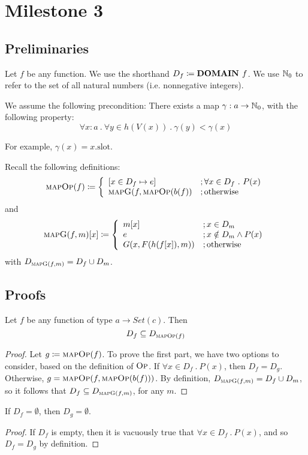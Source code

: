 \section{Milestone 3}

\subsection{Preliminaries}
Let $f$ be any \tlap function. We use the shorthand $D_f \coloneqq \text{\bf DOMAIN } f$.
We use $\mathbb N_0$ to refer to the set of all natural numbers (i.e. nonnegative integers).

We assume the following precondition: There exists a map $\gamma: a \to \mathbb N_0$, with the following property:
\[
\forall x\colon a \ .\ \forall y \in h(V(x)) \ .\ \gamma(y) < \gamma(x) 
\]

For example, $\gamma(x) = x.\text{slot}$.

Recall the following definitions:
\[
\textsc{mapOp}(f) \coloneqq \left\{ \begin{array}{ll} [ x \in D_f \mapsto e ] &; \forall x \in D_f \ .\ P(x) \\ \textsc{mapG}(f, \textsc{mapOp}(b(f)) &; \text{otherwise}\\ \end{array} \right.
\]
and
\[
\textsc{mapG}(f, m)[x] \coloneqq \left\{
\begin{array}{ll}
      m[x] &; x \in D_m \\
      e &; x \notin D_m \land P(x) \\
      G(x, F(h(f[x]), m)) &; \text{otherwise}\\
\end{array} 
\right. 
\]
with $D_{\textsc{mapG}(f,m)} = D_f \cup D_m$.

\subsection{Proofs}

\begin{lemma}\label{lemma1}
Let $f$ be any function of type $a \to Set(c)$. Then
\[
D_f \subseteq D_{\textsc{mapOp}(f)}
\]
\end{lemma}
\begin{proof}
Let $g \coloneqq \textsc{mapOp}(f)$. To prove the first part, we have two options to consider, based on the definition of $\textsc{Op}$. If $\forall x \in D_f \ .\ P(x)$, then $D_f = D_g$.
Otherwise, $g = \textsc{mapOp}(f,\textsc{mapOp}(b(f)))$. By definition, $D_{\textsc{mapG}(f,m)} = D_f \cup D_m$, so it follows that $D_f \subseteq D_{\textsc{mapG}(f,m)}$, for any $m$. 
\end{proof}
\begin{corollary}
If $D_f = \emptyset$, then $D_{g} = \emptyset$.
\end{corollary}
\begin{proof}
If $D_f$ is empty, then it is vacuously true that $\forall x \in D_f \ .\ P(x)$, and so $D_f = D_g$ by definition.
\end{proof}



